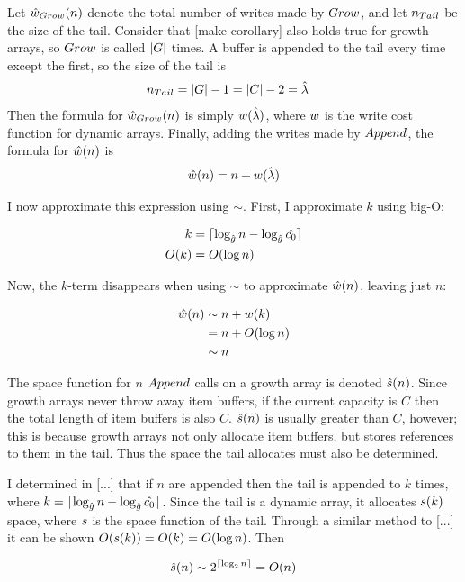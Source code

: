Let ${\hat{w}}_{Grow}(n)$ denote the total number of writes made by $Grow$, and let $n_{Tail}$ be the size of the tail. Consider that [make corollary] also holds true for growth arrays, so $Grow$ is called $|G|$ times. A buffer is appended to the tail every time except the first, so the size of the tail is
\begin{align*}
n_{Tail} &= |G| - 1 = |C| - 2 = \hat{\lambda}
\end{align*}
Then the formula for ${\hat{w}}_{Grow}(n)$ is simply $w(\hat{\lambda})$, where $w$ is the write cost function for dynamic arrays. Finally, adding the writes made by $Append$, the formula for $\hat{w}(n)$ is
\begin{align*}
\hat{w}(n) = n + w(\hat{\lambda})
\end{align*}


I now approximate this expression using $\sim$. First, I approximate $k$ using big-O:

\begin{align*}
k &= \lceil \log_{\hat{g}} n - \log_{\hat{g}} \hat{c_0} \rceil\\
O(k) &= O(\log n)
\end{align*}

Now, the $k$-term disappears when using $\sim$ to approximate $\hat{w}(n)$, leaving just $n$:

\begin{align*}
\hat{w}(n) &\sim n + w(k)\\
&= n + O(\log n)\\
&\sim n
\end{align*}

\HdrSpaceComplex

The space function for $n$ $Append$ calls on a growth array is denoted $\hat{s}(n)$. Since growth arrays never throw away item buffers, if the current capacity is $C$ then the total length of item buffers is also $C$. $\hat{s}(n)$ is usually greater than $C$, however; this is because growth arrays not only allocate item buffers, but stores references to them in the tail. Thus the space the tail allocates must also be determined.

I determined in [...] that if $n$ are appended then the tail is appended to $k$ times, where $k = \lceil \log_{\hat{g}} n - \log_{\hat{g}} \hat{c_0} \rceil$. Since the tail is a dynamic array, it allocates $s(k)$ space, where $s$ is the space function of the tail. Through a similar method to [...] it can be shown $O(s(k)) = O(k) = O(\log n)$. Then %

\begin{align*}
\hat{s}(n) \sim 2^{\lceil \log_2 n \rceil} = O(n)
\end{align*}
